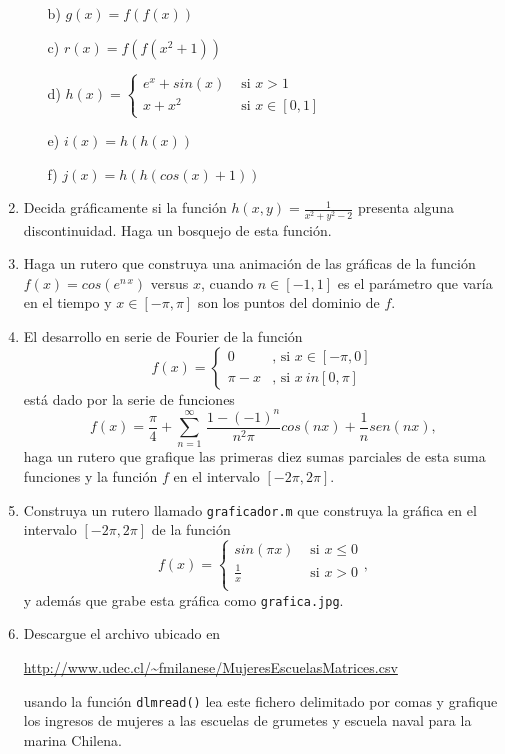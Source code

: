 \documentclass[11pt]{article}
\begin{document}
\begin{enumerate}
\begin{multicols}{2}
\begin{itemize}
  \item[b)] $g(x)=f(f(x))$
  \item[c)] $r(x)=f(f(x^2+1))$
  \item[d)] $h(x)=\begin{cases}
                   e^{x}+sin(x)	& \text{ si } x>1\\
                   x+x^2		& \text{ si } x\in [0,1]
                  \end{cases}$ 

  \item[e)] $i(x)=h(h(x))$
  \item[f)] $j(x)=h(h(cos(x)+1))$
 \end{itemize}
 \end{multicols}
 
 
 \item
Decida gr\'aficamente si la funci\'on $h(x,y)=\frac{1}{x^2+y^2-2}$ presenta alguna discontinuidad. Haga un bosquejo de esta funci\'on.
 
 
 \item Haga un rutero que construya una animaci\'on de las gr\'aficas  de la funci\'on 
 $ f(x)=cos(e^{n \,x})$ versus $x$, cuando $n\in [-1,1]$ es el par\'ametro que var\'ia en el tiempo y $x\in[-\pi,\pi]$ son los puntos del dominio de $f$.
 

\item El desarrollo en serie de Fourier de la funci\'on 
$$
f(x)=
\begin{cases}
0 & \text{, si } x\in[-\pi,0]\\
\pi-x & \text{, si } x\ in[0,\pi]
\end{cases}
$$
est\'a dado por la serie de funciones
$$
\displaystyle
f(x)=\frac{\pi}{4} + \sum_{n=1}^\infty \, \frac{1-(-1)^n}{n^2\pi} cos(nx)+ \frac{1}{n} sen(nx),
$$
haga un rutero que grafique las primeras diez sumas parciales de esta suma funciones y la funci\'on $f$ en el intervalo $[-2\pi,2\pi]$.


\item Construya un rutero llamado \texttt{graficador.m} que construya la gr\'afica en el intervalo $[-2\pi,2\pi]$ de la funci\'on 
$$
f(x)=
\begin{cases}
sin(\pi x)  & \text{ si } x\leq 0\\
\frac{1}{x}	& \text{ si } x>0\\
\end{cases},
$$
y adem\'as que grabe esta gr\'afica como \texttt{grafica.jpg}. 

\item Descargue el archivo ubicado en 
\begin{center}
\url{http://www.udec.cl/~fmilanese/MujeresEscuelasMatrices.csv}
\end{center}
usando la funci\'on \texttt{dlmread()} lea este fichero delimitado por comas y grafique los ingresos de mujeres a las escuelas de grumetes y escuela naval para la marina Chilena.


\end{enumerate}
\end{document}
